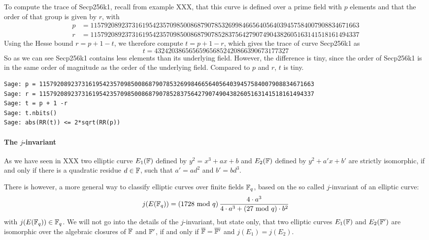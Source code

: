 \begin{example}To compute the trace of Secp256k1, recall from example XXX, that this curve is defined over a prime field with $p$ elements and that the order of that group is given by $r$, with  
\begin{align*}
p &= \scriptstyle 115792089237316195423570985008687907853269984665640564039457584007908834671663\\
r &= \scriptstyle 115792089237316195423570985008687907852837564279074904382605163141518161494337
\end{align*}
Using the Hesse bound $r = p + 1 -t$, we therefore compute $t= p+1 -r$, which gives the trace of curve Secp256k1 as 
$$
t = \scriptstyle 432420386565659656852420866390673177327
$$
So as we can see Secp256k1 contains less elements than its underlying field. However,  the difference is tiny, since the order of Secp256k1 is in the same order of magnitude as the order of the underlying field. Compared to $p$ and $r$, $t$ is tiny.
\begin{verbatim}
Sage: p = 115792089237316195423570985008687907853269984665640564039457584007908834671663
Sage: r = 115792089237316195423570985008687907852837564279074904382605163141518161494337
Sage: t = p + 1 -r
Sage: t.nbits()
Sage: abs(RR(t)) <= 2*sqrt(RR(p))
\end{verbatim}
\end{example} 
\paragraph{The $j$-invariant} As we have seen in XXX two elliptic curve $E_1(\mathbb{F})$ defined by $y^2 = x^3 + ax +b$ and $E_2(\mathbb{F})$ defined by $y^2 + a'x + b'$ are strictly isomorphic, if and only if there is a quadratic residue $d\in \mathbb{F}$, such that $a' = a d^2$ and $b' = b d^3$. 

There is however, a more general way to classify elliptic curves over finite fields $\mathbb{F}_q$, based on the so called $j$-invariant of an elliptic curve:
\begin{equation}
j(E(\mathbb{F}_q)) = \left(1728 \text{ mod } q\right) \frac{4\cdot a^3}{4\cdot a^3+ (27 \text{ mod } q)\cdot b^2}
\end{equation}
with $j(E(\mathbb{F}_q))\in\mathbb{F}_q$. We will not go into the details of the $j$-invariant, but state only, that two elliptic curves $E_1(\mathbb{F})$ and $E_2(\mathbb{F}')$ are isomorphic over the algebraic closures of $\mathbb{F}$ and $\mathbb{F}'$, if and only if $\overline{\mathbb{F}}=\overline{\mathbb{F}'}$ and $j(E_1)=j(E_2)$.

